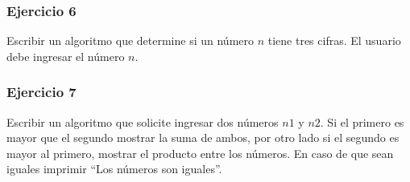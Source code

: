 \subsubsection{Ejercicio 6}
Escribir un algoritmo que determine si un número $n$ tiene tres cifras. El usuario debe ingresar el número $n$.

\subsubsection{Ejercicio 7}
Escribir un algoritmo que solicite ingresar dos números $n1$ y $n2$. Si el primero es mayor que el segundo mostrar la suma de ambos, por otro lado si el segundo es mayor al primero, mostrar el producto entre los números. En caso de que sean iguales imprimir ``Los números son iguales''.
